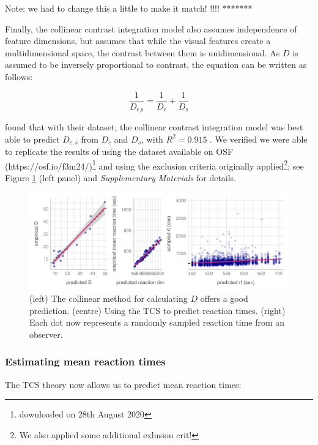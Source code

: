 \documentclass[smallextended, natbib]{svjour3}       %
\begin{document}
Note: we had to change this a little to make it match! !!!! *******

Finally, the collinear contrast integration model also assumes independence of feature dimensions, but assumes that while the visual features create a multidimensional space, the contrast between them is unidimensional. As $D$ is assumed to be inversely proportional to contrast, the equation can be written as follows:

\begin{equation}
\frac{1}{D_\text{c,s}} = \frac{1}{D_\text{c}} + \frac{1}{D_\text{s}}
\label{eq:collinearcontrast}
\end{equation}

\cite{buetti2019predicting} found that with their dataset, the collinear contrast integration model was best able to predict $D_{c,s}$ from $D_c$ and $D_s$, with $R^2 = 0.915 $ . We verified we were able to replicate the results of \cite{buetti2019predicting} using the dataset available on OSF (https://osf.io/f3m24/)\footnote{downloaded on 28th August 2020} and using the exclusion criteria originally applied\footnote{We also applied some additional exlusion crit!}; see Figure \ref{fig:comp_rep} (left panel) and \textit{Supplementary Materials} for details.

\begin{figure}
\centering
\includegraphics[width=\textwidth]{../plots/computational_replication.pdf}
\caption{(left) The collinear method for calculating $D$ offers a good prediction. (centre) Using the TCS to predict reaction times. (right) Each dot now represents a randomly sampled reaction time from an observer.}
\label{fig:comp_rep}
\end{figure}

\subsubsection{Estimating mean reaction times}

The TCS theory now allows us to predict mean reaction times:
\end{document}

